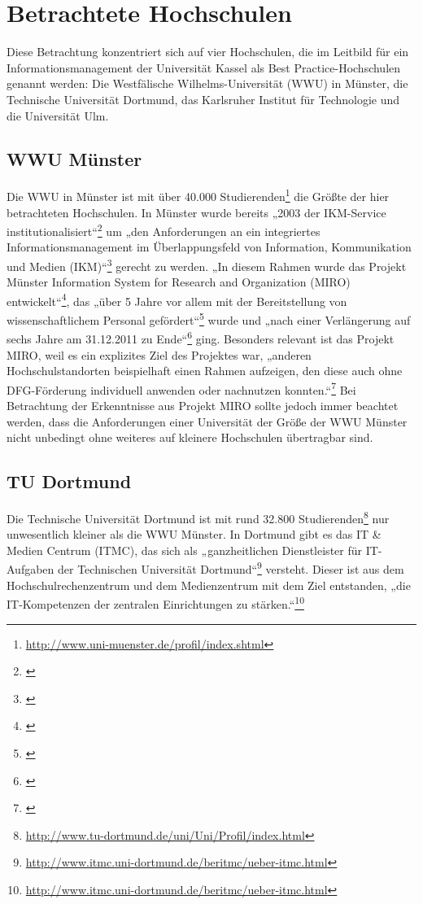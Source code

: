 \section{Betrachtete Hochschulen}
Diese Betrachtung konzentriert sich auf vier Hochschulen, die im Leitbild für ein Informationsmanagement der Universität Kassel als Best Practice-Hochschulen genannt werden: Die Westfälische Wilhelms-Universität (WWU) in Münster, die Technische Universität Dortmund, das  Karlsruher Institut für Technologie und die Universität Ulm.

\subsection{WWU Münster}
Die WWU in Münster ist mit über 40.000 Studierenden\footnote{\url{http://www.uni-muenster.de/profil/index.shtml}} die Größte der hier betrachteten Hochschulen. In Münster wurde bereits „2003 der IKM-Service institutionalisiert“\footnote{\cite[47]{bode_informationsmanagement_2010}} um „den Anforderungen an ein integriertes Informationsmanagement im Überlappungsfeld von Information, Kommunikation und Medien (IKM)“\footnote{\cite{bode_informationsmanagement_2010}} gerecht zu werden. „In diesem Rahmen wurde das Projekt Münster Information System for Research and Organization (MIRO) entwickelt“\footnote{\cite[47]{bode_informationsmanagement_2010}}, das „über 5 Jahre vor allem mit der Bereitstellung von wissenschaftlichem Personal gefördert“\footnote{\cite[7]{vogl_bericht_2013}} wurde und „nach einer Verlängerung auf sechs Jahre am 31.12.2011 zu Ende“\footnote{\cite[1]{vogl_bericht_2013}} ging. Besonders relevant ist das Projekt MIRO, weil es ein explizites Ziel des Projektes war, „anderen Hochschulstandorten beispielhaft einen Rahmen aufzeigen, den diese auch ohne DFG-Förderung individuell anwenden oder nachnutzen konnten.“\footnote{\cite[1]{vogl_bericht_2013}}
Bei Betrachtung der Erkenntnisse aus Projekt MIRO sollte jedoch immer beachtet werden, dass die Anforderungen einer Universität der Größe der WWU Münster nicht unbedingt ohne weiteres auf kleinere Hochschulen übertragbar sind.

\subsection{TU Dortmund}
Die Technische Universität Dortmund ist mit rund 32.800 Studierenden\footnote{\url{http://www.tu-dortmund.de/uni/Uni/Profil/index.html}} nur unwesentlich kleiner als die WWU Münster. In Dortmund gibt es das IT \& Medien Centrum (ITMC), das sich als „ganzheitlichen Dienstleister für IT-Aufgaben der Technischen Universität Dortmund“\footnote{\url{http://www.itmc.uni-dortmund.de/beritmc/ueber-itmc.html}} versteht. Dieser ist aus dem Hochschulrechenzentrum und dem Medienzentrum mit dem Ziel entstanden, „die IT-Kompetenzen der zentralen Einrichtungen zu stärken.“\footnote{\url{http://www.itmc.uni-dortmund.de/beritmc/ueber-itmc.html}}

